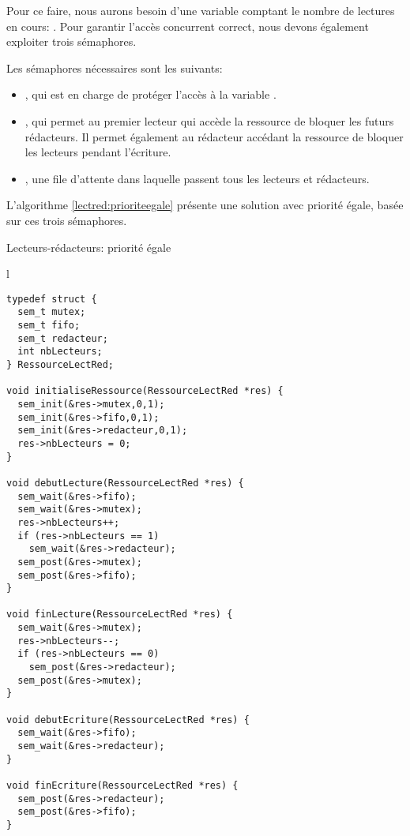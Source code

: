Pour ce faire, nous aurons besoin d'une variable comptant le nombre de lectures en cours: . Pour garantir l'accès concurrent correct, nous devons également exploiter trois sémaphores.

Les sémaphores nécessaires sont les suivants:
\begin{itemize}
\item {}, qui est en charge de protéger l'accès à la variable .
\item {}, qui permet au premier lecteur qui accède la ressource de bloquer les futurs rédacteurs. Il permet également au rédacteur accédant la ressource de bloquer les lecteurs pendant l'écriture.
\item {}, une file d'attente dans laquelle passent tous les lecteurs et rédacteurs.
\end{itemize}

L'algorithme \ref{lectred:prioriteegale} présente une solution avec priorité égale, basée sur ces trois sémaphores.

\begin{algorithm}[h!tp]
\caption{Lecteurs-rédacteurs: priorité égale}\label{lectred:prioriteegale}
\begin{center}
\begin{tabular}{l}
\lstset{language=C++}
\begin{lstlisting}
typedef struct {
  sem_t mutex;
  sem_t fifo;
  sem_t redacteur;
  int nbLecteurs;
} RessourceLectRed;

void initialiseRessource(RessourceLectRed *res) {
  sem_init(&res->mutex,0,1);
  sem_init(&res->fifo,0,1);
  sem_init(&res->redacteur,0,1);
  res->nbLecteurs = 0;
}

void debutLecture(RessourceLectRed *res) {
  sem_wait(&res->fifo);
  sem_wait(&res->mutex);
  res->nbLecteurs++;
  if (res->nbLecteurs == 1)
    sem_wait(&res->redacteur);
  sem_post(&res->mutex);
  sem_post(&res->fifo);
}

void finLecture(RessourceLectRed *res) {
  sem_wait(&res->mutex);
  res->nbLecteurs--;
  if (res->nbLecteurs == 0)
    sem_post(&res->redacteur);
  sem_post(&res->mutex);
}

void debutEcriture(RessourceLectRed *res) {
  sem_wait(&res->fifo);
  sem_wait(&res->redacteur);
}

void finEcriture(RessourceLectRed *res) {
  sem_post(&res->redacteur);
  sem_post(&res->fifo);
}
\end{lstlisting}
\end{tabular}
\end{center}
\end{algorithm}

